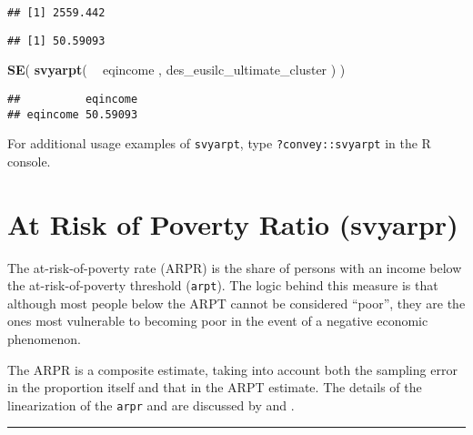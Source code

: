 \documentclass[]{book}
\newenvironment{Shaded}{\begin{snugshade}}{\end{snugshade}}
\newcommand{\CommentTok}[1]{\textcolor[rgb]{0.56,0.35,0.01}{\textit{#1}}}
\newcommand{\KeywordTok}[1]{\textcolor[rgb]{0.13,0.29,0.53}{\textbf{#1}}}
\newcommand{\NormalTok}[1]{#1}
\newcommand{\OperatorTok}[1]{\textcolor[rgb]{0.81,0.36,0.00}{\textbf{#1}}}
\newcommand{\StringTok}[1]{\textcolor[rgb]{0.31,0.60,0.02}{#1}}
\begin{document}
\begin{verbatim}
## [1] 2559.442
\end{verbatim}

\begin{Shaded}
\end{Shaded}

\begin{verbatim}
## [1] 50.59093
\end{verbatim}

\begin{Shaded}
\begin{Highlighting}[]
\KeywordTok{SE}\NormalTok{( }\KeywordTok{svyarpt}\NormalTok{( }\OperatorTok{~}\StringTok{ }\NormalTok{eqincome , des_eusilc_ultimate_cluster ) )}
\end{Highlighting}
\end{Shaded}

\begin{verbatim}
##          eqincome
## eqincome 50.59093
\end{verbatim}

For additional usage examples of \texttt{svyarpt}, type \texttt{?convey::svyarpt} in the R console.

\hypertarget{at-risk-of-poverty-ratio-svyarpr}{%
\section{At Risk of Poverty Ratio (svyarpr)}\label{at-risk-of-poverty-ratio-svyarpr}}

The at-risk-of-poverty rate (ARPR) is the share of persons with an income below the at-risk-of-poverty threshold (\texttt{arpt}). The logic behind this measure is that although most people below the ARPT cannot be considered ``poor'', they are the ones most vulnerable to becoming poor in the event of a negative economic phenomenon.

The ARPR is a composite estimate, taking into account both the sampling error in the proportion itself and that in the ARPT estimate. The details of the linearization of the \texttt{arpr} and are discussed by \citet{deville1999} and \citet{osier2009}.

\begin{center}\rule{0.5\linewidth}{0.5pt}\end{center}
\end{document}
